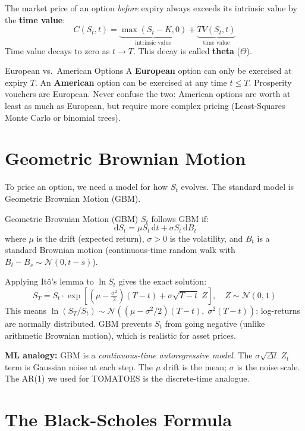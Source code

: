 \documentclass[12pt,a4paper,openany]{report}
\theoremstyle{definition}
\newcommand{\dd}{\,\mathrm{d}}
\begin{document}
The market price of an option \emph{before} expiry always exceeds its intrinsic value by the \textbf{time value}:
\[
  C(S_t, t) = \underbrace{\max(S_t - K, 0)}_{\text{intrinsic value}} + \underbrace{TV(S_t, t)}_{\text{time value}}
\]
Time value decays to zero as $t \to T$. This decay is called \textbf{theta} ($\Theta$).

\begin{warningbox}{European vs.\ American Options}
A \textbf{European} option can only be exercised at expiry $T$. An \textbf{American} option can be exercised at any time $t \leq T$. Prosperity vouchers are European. Never confuse the two: American options are worth at least as much as European, but require more complex pricing (Least-Squares Monte Carlo or binomial trees).
\end{warningbox}

\section{Geometric Brownian Motion}

To price an option, we need a model for how $S_t$ evolves. The standard model is Geometric Brownian Motion (GBM).

\begin{definitionbox}{Geometric Brownian Motion (GBM)}
$S_t$ follows GBM if:
\[
  \dd S_t = \mu S_t \dd t + \sigma S_t \dd B_t
\]
where $\mu$ is the drift (expected return), $\sigma > 0$ is the volatility, and $B_t$ is a standard Brownian motion (continuous-time random walk with $B_t - B_s \sim \mathcal{N}(0, t-s)$).
\end{definitionbox}

Applying Itô's lemma to $\ln S_t$ gives the exact solution:
\[
  S_T = S_t \cdot \exp\!\left[\left(\mu - \tfrac{\sigma^2}{2}\right)(T-t) + \sigma\sqrt{T-t}\; Z\right], \quad Z \sim \mathcal{N}(0,1)
\]
This means $\ln(S_T / S_t) \sim \mathcal{N}\!\left((\mu - \sigma^2/2)(T-t),\; \sigma^2(T-t)\right)$: log-returns are normally distributed. GBM prevents $S_t$ from going negative (unlike arithmetic Brownian motion), which is realistic for asset prices.

\textbf{ML analogy:} GBM is a \emph{continuous-time autoregressive model}. The $\sigma\sqrt{\Delta t}\; Z_t$ term is Gaussian noise at each step. The $\mu$ drift is the mean; $\sigma$ is the noise scale. The AR(1) we used for TOMATOES is the discrete-time analogue.

\section{The Black-Scholes Formula}
\end{document}
